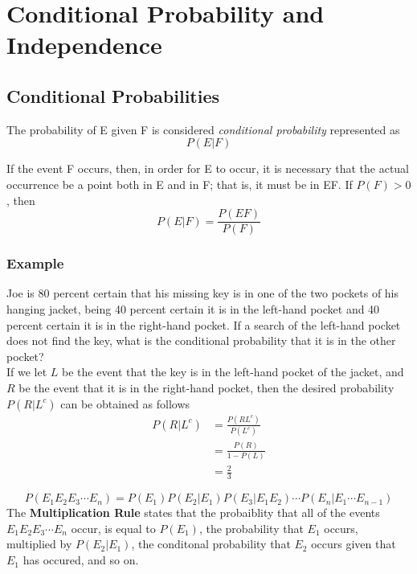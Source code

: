 \setcounter{chapter}{2}
\chapter{Conditional Probability and Independence}
\section{Conditional Probabilities}
\begin{definition}
The probability of E given F is considered \textit{conditional probability} represented as \[P(E|F)\]
\end{definition}
If the event F occurs, then, in order for E to occur, it is necessary that the actual occurrence be a point both in E and in F; that is, it must be in EF. If $P(F) > 0$, then 
\[P(E|F) = \frac{P(EF)}{P(F)}\]
\subsection*{Example}
Joe is 80 percent certain that his missing key is in one of the two pockets of his
hanging jacket, being 40 percent certain it is in the left-hand pocket and
40 percent certain it is in the right-hand pocket. If a search of the left-hand pocket
does not find the key, what is the conditional probability that it is in the other
pocket?\\
If we let $L$ be the event that the key is in the left-hand pocket of the jacket, and $R$ be the event that it is in the right-hand pocket, then the desired probability $P(R|L^c)$ can be obtained as follows
\begin{equation*} 
	\begin{split}
	P(R|L^c) & = \frac{P(RL^c)}{P(L^c)} \\
	 & = \frac{P(R)}{1-P(L)} \\
  & = \frac{2}{3}
	\end{split}
 \end{equation*}
\begin{theorem}
\[P(E_1E_2E_3\cdots E_n) = P(E_1)P(E_2|E_1)P(E_3|E_1E_2)\cdots P(E_n|E_1\cdots E_{n-1})\]
The \textbf{Multiplication Rule} states that the probaiblity that all of the events $E_1E_2E_3\cdots E_n$ occur, is equal to $P(E_1)$, the probability that $E_1$ occurs, multiplied by $P(E_2 | E_1)$, the conditonal probability that $E_2$ occurs given that $E_1$ has occured, and so on. 
\end{theorem}
